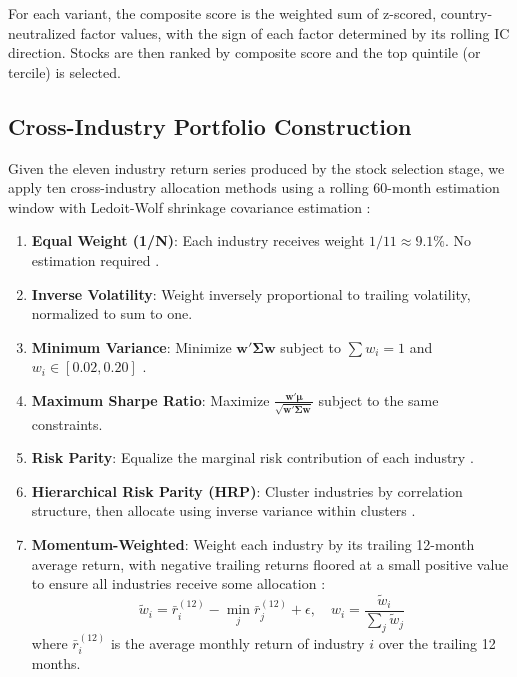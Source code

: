\documentclass[12pt,a4paper]{article}
\begin{document}
For each variant, the composite score is the weighted sum of z-scored, country-neutralized factor values, with the sign of each factor determined by its rolling IC direction. Stocks are then ranked by composite score and the top quintile (or tercile) is selected.

\subsection{Cross-Industry Portfolio Construction}

Given the eleven industry return series produced by the stock selection stage, we apply ten cross-industry allocation methods using a rolling 60-month estimation window with Ledoit-Wolf shrinkage covariance estimation \citep{ledoitwolf2004}:

\begin{enumerate}
    \item \textbf{Equal Weight (1/N)}: Each industry receives weight $1/11 \approx 9.1\%$. No estimation required \citep{demiguel2009}.

    \item \textbf{Inverse Volatility}: Weight inversely proportional to trailing volatility, normalized to sum to one.

    \item \textbf{Minimum Variance}: Minimize $\mathbf{w}'\boldsymbol{\Sigma}\mathbf{w}$ subject to $\sum w_i = 1$ and $w_i \in [0.02, 0.20]$ \citep{markowitz1952}.

    \item \textbf{Maximum Sharpe Ratio}: Maximize $\frac{\mathbf{w}'\boldsymbol{\mu}}{\sqrt{\mathbf{w}'\boldsymbol{\Sigma}\mathbf{w}}}$ subject to the same constraints.

    \item \textbf{Risk Parity}: Equalize the marginal risk contribution of each industry \citep{maillard2010}.

    \item \textbf{Hierarchical Risk Parity (HRP)}: Cluster industries by correlation structure, then allocate using inverse variance within clusters \citep{lopezdeprado2016}.

    \item \textbf{Momentum-Weighted}: Weight each industry by its trailing 12-month average return, with negative trailing returns floored at a small positive value to ensure all industries receive some allocation \citep{jegadeeshtitman1993}:
    \begin{equation}
        \tilde{w}_i = \bar{r}_i^{(12)} - \min_j \bar{r}_j^{(12)} + \epsilon, \quad w_i = \frac{\tilde{w}_i}{\sum_j \tilde{w}_j}
    \end{equation}
    where $\bar{r}_i^{(12)}$ is the average monthly return of industry $i$ over the trailing 12 months.


\end{enumerate}
\end{document}
